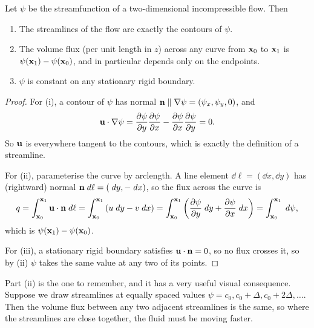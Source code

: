 \documentclass[a4paper]{scrartcl}
\newcommand{\pd}[2]{\frac{\partial #1}{\partial #2}}
\newcommand{\bell}{\boldsymbol{\ell}}
\begin{document}
\begin{proposition}
	Let $\psi$ be the streamfunction of a two-dimensional incompressible flow. Then
	\begin{enumerate}[label=(\roman*)]
		\item The streamlines of the flow are exactly the contours of $\psi$.
		\item The volume flux (per unit length in $z$) across any curve from $\mathbf{x}_0$ to $\mathbf{x}_1$ is $\psi(\mathbf{x}_1) - \psi(\mathbf{x}_0)$, and in particular depends only on the endpoints.
		\item $\psi$ is constant on any stationary rigid boundary.
	\end{enumerate}
\end{proposition}
\begin{proof}
	For (i), a contour of $\psi$ has normal $\mathbf{n} \parallel \nabla \psi = (\psi_x, \psi_y, 0)$, and
	$$
	\vv u \cdot \nabla \psi = \pd{\psi}{y}\pd{\psi}{x} - \pd{\psi}{x}\pd{\psi}{y} = 0.
	$$
	So $\mathbf{u}$ is everywhere tangent to the contours, which is exactly the definition of a streamline.

	For (ii), parameterise the curve by arclength. A line element $\dd \bell = (\dd x, \dd y)$ has (rightward) normal $\mathbf{n} \; d \ell = (\; d y, -\; d x)$, so the flux across the curve is
	$$
	q = \int_{\vv x_0}^{\vv x_1} \vv u \cdot \vv n \dd \ell = \int_{\vv x_0}^{\vv x_1} \left(u \dd y - v \dd x\right) = \int_{\vv x_0}^{\vv x_1}\left(\pd{\psi}{y}\dd y + \pd{\psi}{x}\dd x \right)= \int_{\vv x_0}^{\vv x_1} \dd \psi,
	$$
	which is $\psi(\mathbf{x}_1) - \psi(\mathbf{x}_0)$.

	For (iii), a stationary rigid boundary satisfies $\mathbf{u} \cdot \mathbf{n} = 0$, so no flux crosses it, so by (ii) $\psi$ takes the same value at any two of its points. \qedhere
\end{proof}

Part (ii) is the one to remember, and it has a very useful visual consequence. Suppose we draw streamlines at equally spaced values $\psi = c_0, c_0 + \Delta, c_0 + 2\Delta, \dots$. Then the volume flux between any two adjacent streamlines is the same, so where the streamlines are close together, the fluid must be moving faster.

\begin{center}
\end{center}
\end{document}
